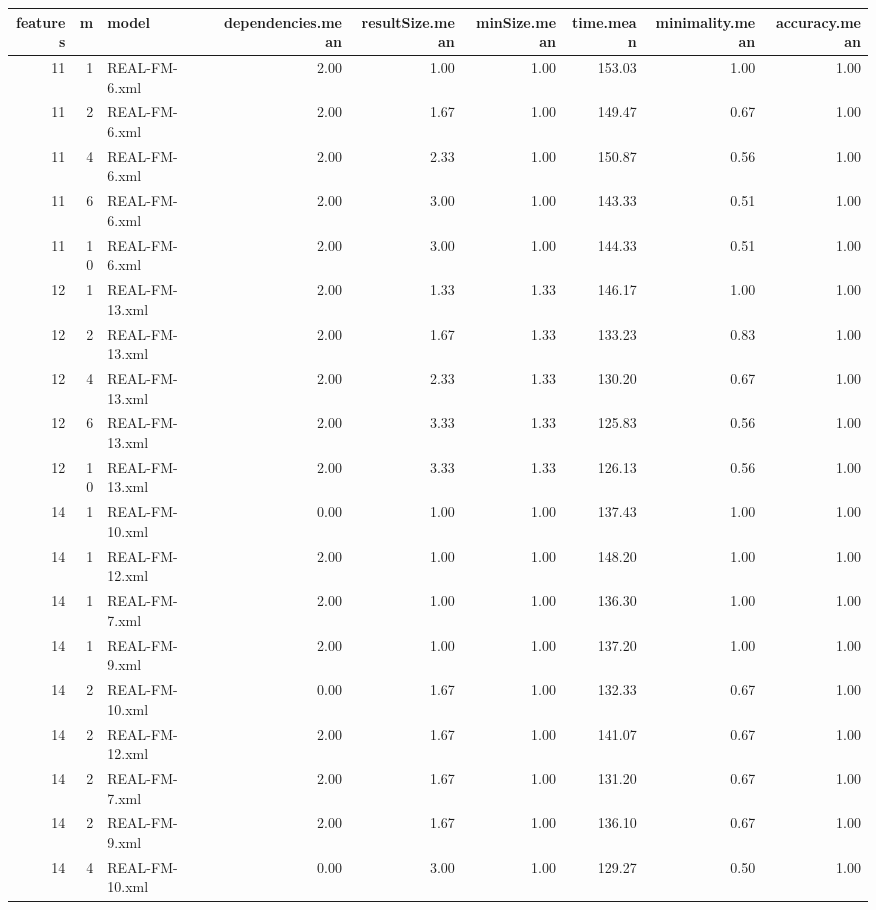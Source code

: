 \begin{table}[ht]
\centering
\begin{tabular}{rrlrrrrrr}
  \hline
features & m & model & dependencies.mean & resultSize.mean & minSize.mean & time.mean & minimality.mean & accuracy.mean \\ 
  \hline
 11 &   1 & REAL-FM-6.xml & 2.00 & 1.00 & 1.00 & 153.03 & 1.00 & 1.00 \\ 
   11 &   2 & REAL-FM-6.xml & 2.00 & 1.67 & 1.00 & 149.47 & 0.67 & 1.00 \\ 
   11 &   4 & REAL-FM-6.xml & 2.00 & 2.33 & 1.00 & 150.87 & 0.56 & 1.00 \\ 
   11 &   6 & REAL-FM-6.xml & 2.00 & 3.00 & 1.00 & 143.33 & 0.51 & 1.00 \\ 
   11 &  10 & REAL-FM-6.xml & 2.00 & 3.00 & 1.00 & 144.33 & 0.51 & 1.00 \\ 
   12 &   1 & REAL-FM-13.xml & 2.00 & 1.33 & 1.33 & 146.17 & 1.00 & 1.00 \\ 
   12 &   2 & REAL-FM-13.xml & 2.00 & 1.67 & 1.33 & 133.23 & 0.83 & 1.00 \\ 
   12 &   4 & REAL-FM-13.xml & 2.00 & 2.33 & 1.33 & 130.20 & 0.67 & 1.00 \\ 
   12 &   6 & REAL-FM-13.xml & 2.00 & 3.33 & 1.33 & 125.83 & 0.56 & 1.00 \\ 
   12 &  10 & REAL-FM-13.xml & 2.00 & 3.33 & 1.33 & 126.13 & 0.56 & 1.00 \\ 
   14 &   1 & REAL-FM-10.xml & 0.00 & 1.00 & 1.00 & 137.43 & 1.00 & 1.00 \\ 
   14 &   1 & REAL-FM-12.xml & 2.00 & 1.00 & 1.00 & 148.20 & 1.00 & 1.00 \\ 
   14 &   1 & REAL-FM-7.xml & 2.00 & 1.00 & 1.00 & 136.30 & 1.00 & 1.00 \\ 
   14 &   1 & REAL-FM-9.xml & 2.00 & 1.00 & 1.00 & 137.20 & 1.00 & 1.00 \\ 
   14 &   2 & REAL-FM-10.xml & 0.00 & 1.67 & 1.00 & 132.33 & 0.67 & 1.00 \\ 
   14 &   2 & REAL-FM-12.xml & 2.00 & 1.67 & 1.00 & 141.07 & 0.67 & 1.00 \\ 
   14 &   2 & REAL-FM-7.xml & 2.00 & 1.67 & 1.00 & 131.20 & 0.67 & 1.00 \\ 
   14 &   2 & REAL-FM-9.xml & 2.00 & 1.67 & 1.00 & 136.10 & 0.67 & 1.00 \\ 
   14 &   4 & REAL-FM-10.xml & 0.00 & 3.00 & 1.00 & 129.27 & 0.50 & 1.00 \\ 

\end{tabular}
\end{table}
